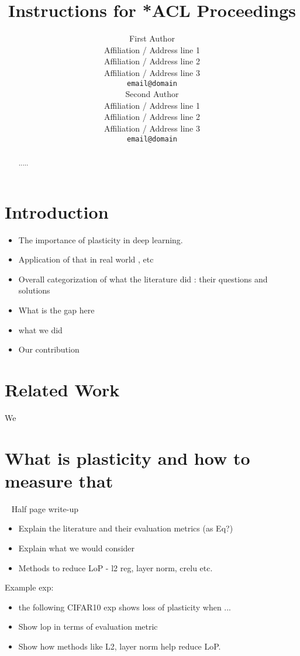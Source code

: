 \documentclass[11pt]{article}
\title{Instructions for *ACL Proceedings}
\author{First Author \\
  Affiliation / Address line 1 \\
  Affiliation / Address line 2 \\
  Affiliation / Address line 3 \\
  \texttt{email@domain} \\\And
  Second Author \\
  Affiliation / Address line 1 \\
  Affiliation / Address line 2 \\
  Affiliation / Address line 3 \\
  \texttt{email@domain} \\}
\begin{document}
\maketitle
\begin{abstract}
.....
\end{abstract}

\section{Introduction}


\begin{itemize}
    \item The importance of plasticity in deep learning.
    \item Application of that in real world , etc 
    \item Overall categorization of what the literature did : their questions and solutions 
    \item What is the gap here
    \item what we did
    \item Our contribution
\end{itemize}



\section{Related Work}

We

\section{What is plasticity and how to measure that}

~ Half page write-up
\begin{itemize}
    \item Explain the literature and their evaluation metrics (as Eq?)
    \item Explain what we would consider
    \item Methods to reduce LoP - l2 reg, layer norm, crelu etc.
\end{itemize}


Example exp:
\begin{itemize}
    \item the following CIFAR10 exp shows loss of plasticity when ... 
    \item Show lop in terms of evaluation metric 
    \item Show how methods like L2, layer norm help reduce LoP.
\end{itemize}
\end{document}
